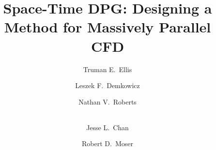 \documentclass[preprint,12pt]{elsarticle}
\begin{document}
\begin{frontmatter}



\title{Space-Time DPG: Designing a Method for Massively Parallel CFD}


\author[ices]{Truman E.~Ellis}
\author[ices]{Leszek F.~Demkowicz}
\author[anl]{Nathan V.~Roberts}
\author[rice]{\\Jesse L.~Chan}
\author[ices]{Robert D.~Moser}

\address[ices]{Institute for Computational Engineering and Sciences,
University of Texas at Austin
201 East 24th St, Stop C0200, Austin, TX 78703}
\address[anl]{Argonne Leadership Computing Facility,
Argonne National Laboratory
9700 South Cass Avenue Building 240, Argonne, IL 60439}
\address[rice]{Computational and Applied Mathematics,
Rice University
6100 Main MS-134, Houston, TX 77005}

\begin{abstract}


\end{abstract}
\end{frontmatter}
\end{document}
